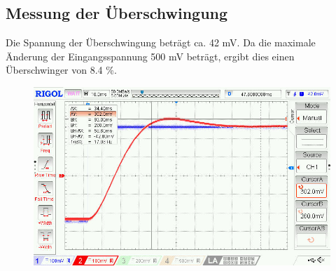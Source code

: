 \documentclass[twoside]{article}
\begin{document}
\subsection{Messung der Überschwingung}
Die Spannung der Überschwingung beträgt ca. 42 mV. Da die maximale Änderung der Eingangsspannung 500 mV beträgt, ergibt dies einen Überschwinger von 8.4 \%.
\begin{figure}[h]
    \centering
    \includegraphics[width=0.8\linewidth]{img/Bode_03.jpg}
\end{figure}
\end{document}

